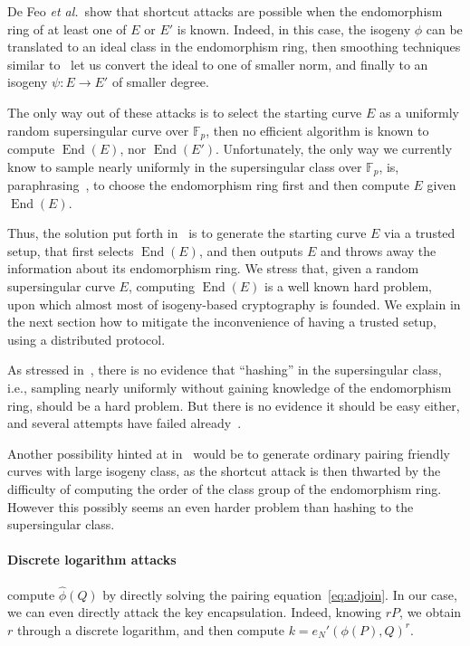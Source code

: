 \documentclass{llncs}
\newcommand{\F}{\mathbb{F}}
\DeclareMathOperator{\End}{End}
\begin{document}
De Feo \emph{et al.}\ show that shortcut attacks are possible when the
endomorphism ring of at least one of $E$ or $E'$ is known. %
Indeed, in this case, the isogeny $\phi$ can be translated to an ideal
class in the endomorphism ring, then smoothing techniques similar
to~\cite{kohel2014quaternion} let us convert the ideal to one of
smaller norm, and finally to an isogeny $\psi:E\to E'$ of smaller
degree.

The only way out of these attacks is to select the starting curve $E$
as a uniformly random supersingular curve over $\F_p$, then no
efficient algorithm is known to compute $\End(E)$, nor $\End(E')$. %
Unfortunately, the only way we currently know to sample nearly
uniformly in the supersingular class over $\F_p$, is,
paraphrasing~\cite{galbraith2018computational}, to choose the
endomorphism ring first and then compute $E$ given $\End(E)$.

Thus, the solution put forth in~\cite{10.1007/978-3-030-34578-5_10} is
to generate the starting curve $E$ via a trusted setup, that first
selects $\End(E)$, and then outputs $E$ and throws away the
information about its endomorphism ring. %
We stress that, given a random supersingular curve $E$, computing
$\End(E)$ is a well known hard problem, upon which almost most of
isogeny-based cryptography is founded. %
We explain in the next section how to mitigate the inconvenience of
having a trusted setup, using a distributed protocol.

As stressed in~\cite{10.1007/978-3-030-34578-5_10}, there is no
evidence that ``hashing'' in the supersingular class, i.e., sampling
nearly uniformly without gaining knowledge of the endomorphism ring,
should be a hard problem. %
But there is no evidence it should be easy either, and several
attempts have failed
already~\cite{10.1007/978-3-030-45724-2_18,love2019supersingular}.

Another possibility hinted at in~\cite{10.1007/978-3-030-34578-5_10}
would be to generate ordinary pairing friendly curves with large
isogeny class, as the shortcut attack is then thwarted by the
difficulty of computing the order of the class group of the
endomorphism ring. %
However this possibly seems an even harder problem than hashing to the
supersingular class.

\paragraph{Discrete logarithm attacks} compute $\hat\phi(Q)$ by
directly solving the pairing equation~\eqref{eq:adjoin}. %
In our case, we can even directly attack the key encapsulation. %
Indeed, knowing $rP$, we obtain $r$ through a discrete logarithm, and
then compute $k=e_N'(\phi(P),Q)^r$.
\end{document}
